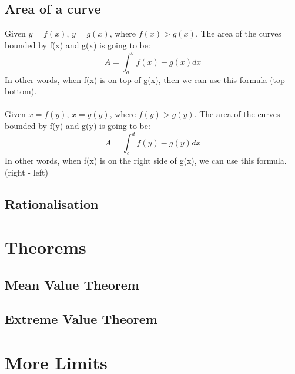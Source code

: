 \documentclass{article}
\begin{document}
\subsection{Area of a curve}
Given $y = f(x)$, $y = g(x)$, where $f(x) > g(x)$.
The area of the curves bounded by f(x) and g(x) is going to be:
\begin{equation*}
  A = \int_{a}^{b} f(x)-g(x)dx
\end{equation*}
In other words, when f(x) is on top of g(x), then we can use this formula (top - bottom).
\\\\
Given $x = f(y)$, $x = g(y)$, where $f(y) > g(y)$.
The area of the curves bounded by f(y) and g(y) is going to be:
\begin{equation*}
  A = \int_{c}^{d} f(y)-g(y)dx
\end{equation*}
In other words, when f(x) is on the right side of g(x), we can use this formula. (right - left)
\begin{comment}
\begin{center}
\begin{tikzpicture}
\begin{axis}[
    axis lines = left,
    xlabel = \(x\),
    ylabel = {\(y\)},
]
\addplot [
    domain=-10:10, 
    samples=100, 
    color=red,
]
{x^2 -4*x};
\addlegendentry{\(x^2 + 2x + 1\)}

\end{axis}
\end{tikzpicture}
\end{center}
\end{comment}

\subsection{Rationalisation}
\section{Theorems}
\subsection{Mean Value Theorem}
\subsection{Extreme Value Theorem}
\section{More Limits}
\end{document}
